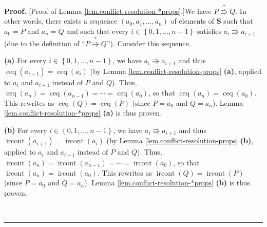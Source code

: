 \documentclass[numbers=enddot,12pt,final,onecolumn,notitlepage]{scrartcl}%
\theoremstyle{definition}
\newenvironment{proof}[1][Proof]{\noindent\textbf{#1.} }{\ \rule{0.5em}{0.5em}}
\begin{document}
\begin{proof}
[Proof of Lemma \ref{lem.conflict-resolution-*props}.]We have $P\overset{\ast
}{\Rrightarrow}Q$. In other words, there exists a sequence $\left(
a_{0},a_{1},\ldots,a_{n}\right)  $ of elements of $\mathbf{S}$ such that
$a_{0}=P$ and $a_{n}=Q$ and such that every $i\in\left\{  0,1,\ldots
,n-1\right\}  $ satisfies $a_{i}\Rrightarrow a_{i+1}$ (due to the definition
of \textquotedblleft$P\overset{\ast}{\Rrightarrow}Q$\textquotedblright).
Consider this sequence.

\textbf{(a)} For every $i\in\left\{  0,1,\ldots,n-1\right\}  $, we have
$a_{i}\Rrightarrow a_{i+1}$ and thus $\operatorname*{ceq}\left(
a_{i+1}\right)  =\operatorname*{ceq}\left(  a_{i}\right)  $ (by Lemma
\ref{lem.conflict-resolution-props} \textbf{(a)}, applied to $a_{i}$ and
$a_{i+1}$ instead of $P$ and $Q$). Thus, $\operatorname*{ceq}\left(
a_{n}\right)  =\operatorname*{ceq}\left(  a_{n-1}\right)  =\cdots
=\operatorname*{ceq}\left(  a_{0}\right)  $, so that $\operatorname*{ceq}%
\left(  a_{n}\right)  =\operatorname*{ceq}\left(  a_{0}\right)  $. This
rewrites as $\operatorname*{ceq}\left(  Q\right)  =\operatorname*{ceq}\left(
P\right)  $ (since $P=a_{0}$ and $Q=a_{n}$). Lemma
\ref{lem.conflict-resolution-*props} \textbf{(a)} is thus proven.

\textbf{(b)} For every $i\in\left\{  0,1,\ldots,n-1\right\}  $, we have
$a_{i}\Rrightarrow a_{i+1}$ and thus $\operatorname*{ircont}\left(
a_{i+1}\right)  =\operatorname*{ircont}\left(  a_{i}\right)  $ (by Lemma
\ref{lem.conflict-resolution-props} \textbf{(b)}, applied to $a_{i}$ and
$a_{i+1}$ instead of $P$ and $Q$). Thus, $\operatorname*{ircont}\left(
a_{n}\right)  =\operatorname*{ircont}\left(  a_{n-1}\right)  =\cdots
=\operatorname*{ircont}\left(  a_{0}\right)  $, so that
$\operatorname*{ircont}\left(  a_{n}\right)  =\operatorname*{ircont}\left(
a_{0}\right)  $. This rewrites as $\operatorname*{ircont}\left(  Q\right)
=\operatorname*{ircont}\left(  P\right)  $ (since $P=a_{0}$ and $Q=a_{n}$).
Lemma \ref{lem.conflict-resolution-*props} \textbf{(b)} is thus proven.


\end{proof}
\end{document}
